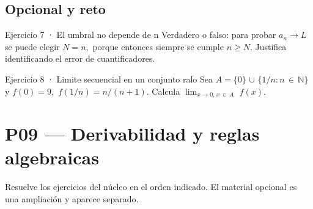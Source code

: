 \documentclass[10pt,a4paper,oneside,openany]{book}
\begin{document}
\section*{Opcional y reto}
\begin{PSevenOptionalFixed}{Ejercicio 7 · El umbral no depende de n}
Verdadero o falso: para probar \(a_n\to L\) se puede elegir \(N=n,\) porque entonces siempre se cumple \(n\ge N\). Justifica identificando el error de cuantificadores.
\end{PSevenOptionalFixed}
\begin{PSevenOptionalFixed}{Ejercicio 8 · Limite secuencial en un conjunto ralo}
Sea \(A=\{0\}\) \(\cup \) \(\{1/n:n\,\in \,\mathbb{N}\}\) y \(f(0)=9,\) \(f(1/n)=n/(n+1)\). Calcula \(\lim_{x\to 0,\,x\,\in \,A}\) \(f(x)\).
\end{PSevenOptionalFixed}
\chapter{P09 — Derivabilidad y reglas algebraicas}
Resuelve los ejercicios del núcleo en el orden indicado. El material opcional es una ampliación y aparece separado.
\end{document}

